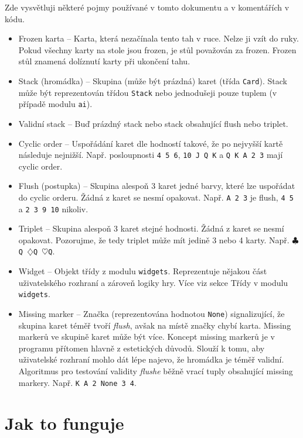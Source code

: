 \documentclass{article}
\begin{document}
Zde vysvětluji některé pojmy používané v tomto dokumentu a v komentářích v
kódu.

\begin{itemize}
	\item Frozen karta -- Karta, která nezačínala tento tah v ruce. Nelze
		ji vzít do ruky. Pokud všechny karty na stole jsou frozen, je
		stůl považován za frozen. Frozen stůl znamená dolíznutí karty
		při ukončení tahu.
	\item Stack (hromádka) -- Skupina (může být prázdná) karet (třída
		\texttt{Card}). Stack může být reprezentován třídou
		\texttt{Stack} nebo jednodušeji pouze tuplem (v případě modulu
		\texttt{ai}).
	\item Validní stack -- Buď prázdný stack nebo stack obsahující flush
		nebo triplet.
	\item Cyclic order -- Uspořádání karet dle hodností takové, že po
		nejvyšší kartě následuje nejnižší. Např. posloupnosti \texttt{4
		5 6}, \texttt{10 J Q K} a \texttt{Q K A 2 3} mají cyclic order.
	\item Flush (postupka) -- Skupina alespoň 3 karet jedné barvy, které
		lze uspořádat do cyclic orderu. Žádná z karet se nesmí
		opakovat. Např. \texttt{A 2 3} je flush, \texttt{4 5} a
		\texttt{2 3 9 10} nikoliv.
	\item Triplet -- Skupina alespoň 3 karet stejné hodnosti. Žádná z karet
		se nesmí opakovat. Pozorujme, že tedy triplet může mít jedině 3
		nebo 4 karty. Např. \texttt{$\clubsuit$Q $\diamondsuit$Q
		$\heartsuit$Q}.
	\item Widget -- Objekt třídy z modulu \texttt{widgets}. Reprezentuje
		nějakou část uživatelského rozhraní a zároveň logiky hry. Více
		viz sekce Třídy v modulu \texttt{widgets}.
	\item Missing marker -- Značka (reprezentována hodnotou \texttt{None})
		signalizující, že skupina karet téměř tvoří \emph{flush},
		avšak na místě značky chybí karta. Missing markerů ve skupině
		karet může být více. Koncept missing markerů je v programu
		přítomen hlavně z estetických důvodů. Slouží k tomu, aby
		uživatelské rozhraní mohlo dát lépe najevo, že hromádka je
		téměř validní. Algoritmus pro testování validity \emph{flushe}
		běžně vrací tuply obsahující missing markery. Např. \texttt{K A
		2 None 3 4}.
\end{itemize}

\section*{Jak to funguje}
\end{document}
